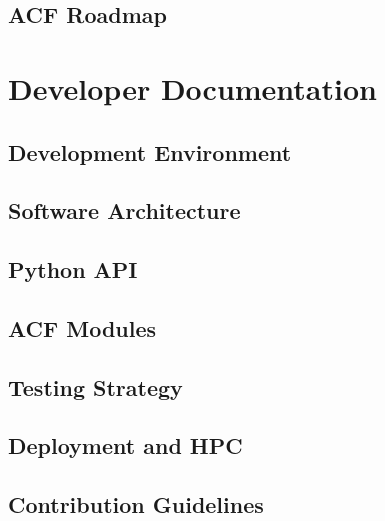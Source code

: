 \documentclass[11pt,a4paper,oneside]{report}
\begin{document}
\chapter{ACF Roadmap}






\part{Developer Documentation}



\chapter{Development Environment}




\chapter{Software Architecture}




\chapter{Python API}




\chapter{ACF Modules}




\chapter{Testing Strategy}




\chapter{Deployment and HPC}




\chapter{Contribution Guidelines}

\end{document}
